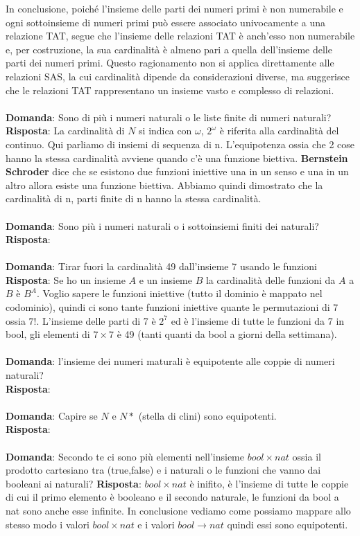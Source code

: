 \documentclass{article}
\begin{document}
In conclusione, poiché l'insieme delle parti dei numeri primi è non numerabile e ogni sottoinsieme di numeri primi può essere associato univocamente a una relazione TAT, segue che l'insieme delle relazioni TAT è anch'esso non numerabile e, per costruzione, la sua cardinalità è almeno pari a quella dell'insieme delle parti dei numeri primi. Questo ragionamento non si applica direttamente alle relazioni SAS, la cui cardinalità dipende da considerazioni diverse, ma suggerisce che le relazioni TAT rappresentano un insieme vasto e complesso di relazioni. \\ \\
\textbf{Domanda}: Sono di più i numeri naturali o le liste finite di numeri naturali? \\
\textbf{Risposta}: La cardinalità di $N$ si indica con $\omega$, $2^\omega$ è riferita alla cardinalità del continuo. Qui parliamo di insiemi di sequenza di n.
L'equipotenza ossia che 2 cose hanno la stessa cardinalità avviene quando c'è una funzione biettiva. \textbf{Bernstein Schroder} dice che se esistono due funzioni iniettive una in un senso e una in un altro allora esiste una funzione biettiva. Abbiamo quindi dimostrato che la cardinalità di n, parti finite di n hanno la stessa cardinalità. \\ \\
\textbf{Domanda}: Sono più i numeri naturali o i sottoinsiemi finiti dei naturali?
\textbf{Risposta}: \\ \\
\textbf{Domanda}: Tirar fuori la cardinalità 49 dall’insieme 7 usando le funzioni \\
\textbf{Risposta}: Se ho un insieme $A$ e un insieme $B$ la cardinalità delle funzioni da $A$ a $B$ è $B^A$. Voglio sapere le funzioni iniettive (tutto il dominio è mappato nel codominio), quindi ci sono tante funzioni iniettive quante le permutazioni di 7 ossia $7!$. L'insieme delle parti di 7 è $2^7$ ed è l'insieme di tutte le funzioni da 7 in bool, gli elementi di $7 \times 7$ è 49 (tanti quanti da bool a giorni della settimana). \\ \\
\textbf{Domanda}: l'insieme dei numeri maturali è equipotente alle coppie di numeri naturali? \\
\textbf{Risposta}: \\ \\
\textbf{Domanda}: Capire se $N$ e $N*$ (stella di clini) sono equipotenti. \\
\textbf{Risposta}: \\ \\
\textbf{Domanda}: Secondo te ci sono più elementi nell'insieme $bool \times nat$ ossia il prodotto cartesiano tra (true,false) e i naturali o le funzioni che vanno dai booleani ai naturali?
\textbf{Risposta}: $bool \times nat$ è inifito, è l'insieme di tutte le coppie di cui il primo elemento è booleano e il secondo naturale, le funzioni da bool a nat sono anche esse infinite.
In conclusione vediamo come possiamo mappare allo stesso modo i valori $bool \times nat$ e i valori $bool \to nat$ quindi essi sono equipotenti.\\ \\
\end{document}
